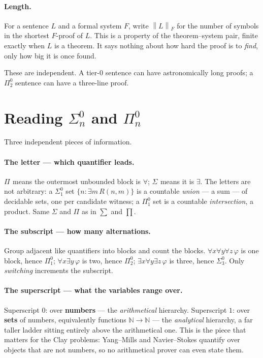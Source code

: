 \documentclass[11pt,a4paper]{article}
\newcommand{\Sig}[2]{\Sigma^{#1}_{#2}}
\newcommand{\Pai}[2]{\Pi^{#1}_{#2}}
\newcommand{\shortest}[1]{\left\lVert #1 \right\rVert}
\begin{document}
\paragraph{Length.} For a sentence $L$ and a formal system $F$, write
$\shortest{L}_F$ for the number of symbols in the shortest $F$-proof of $L$.
This is a property of the theorem--system pair, finite exactly when $L$ is a
theorem. It says nothing about how hard the proof is to \emph{find}, only how
big it is once found.

These are independent. A tier-$0$ sentence can have astronomically long proofs;
a $\Pai{0}{2}$ sentence can have a three-line proof.

\section{Reading $\Sig{0}{n}$ and $\Pai{0}{n}$}\label{sec:notation}

Three independent pieces of information.

\paragraph{The letter --- which quantifier leads.} $\Pai{}{}$ means the
outermost unbounded block is $\forall$; $\Sig{}{}$ means it is $\exists$. The
letters are not arbitrary: a $\Sig{0}{1}$ set $\{n : \exists m\, R(n,m)\}$ is a
countable \emph{union} --- a sum --- of decidable sets, one per candidate
witness; a $\Pai{0}{1}$ set is a countable \emph{intersection}, a product. Same
$\Sigma$ and $\Pi$ as in $\sum$ and $\prod$.

\paragraph{The subscript --- how many alternations.} Group adjacent like
quantifiers into blocks and count the blocks. $\forall x \forall y \forall z\,
\varphi$ is one block, hence $\Pai{0}{1}$; $\forall x \exists y\, \varphi$ is
two, hence $\Pai{0}{2}$; $\exists x \forall y \exists z\, \varphi$ is three,
hence $\Sig{0}{3}$. Only \emph{switching} increments the subscript.

\paragraph{The superscript --- what the variables range over.} Superscript $0$:
over \textbf{numbers} --- the \emph{arithmetical} hierarchy. Superscript $1$:
over \textbf{sets} of numbers, equivalently functions $\mathbb{N} \to
\mathbb{N}$ --- the \emph{analytical} hierarchy, a far taller ladder sitting
entirely above the arithmetical one. This is the piece that matters for the
Clay problems: Yang--Mills and Navier--Stokes quantify over objects that are
not numbers, so no arithmetical prover can even state them.
\end{document}
